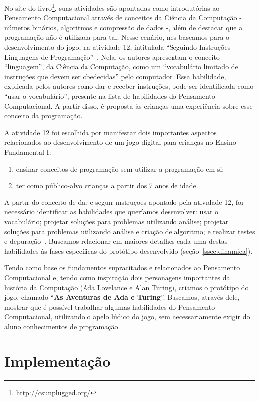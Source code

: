 No site do livro\footnote{http://csunplugged.org/}, suas atividades são apontadas como introdutórias ao Pensamento Computacional através de conceitos da Ciência da Computação - números binários, algoritmos e compressão de dados -, além de destacar que a programação não é utilizada para tal. Nesse cenário, nos baseamos para o desenvolvimento do jogo, na atividade 12, intitulada “Seguindo Instruções—Linguagens de Programação”~\cite[~p.101]{bell_computer_2011}. Nela, os autores apresentam o conceito “linguagem”, da Ciência da Computação, como um “vocabulário limitado de instruções que devem ser obedecidas” pelo computador. Essa habilidade, explicada pelos autores como dar e receber instruções, pode ser identificada como “usar o vocabulário”, presente na lista de habilidades do Pensamento Computacional. A partir disso, é proposta às crianças uma experiência sobre esse conceito da programação.

A atividade 12 foi escolhida por manifestar dois importantes aspectos relacionados ao desenvolvimento de um jogo digital para crianças no Ensino Fundamental I:

\begin{enumerate}
	\item ensinar conceitos de programação sem utilizar a programação em si;
	\item ter como público-alvo crianças a partir dos 7 anos de idade.
\end{enumerate}

A partir do conceito de dar e seguir instruções apontado pela atividade 12, foi necessário identificar as habilidades que queríamos desenvolver: usar o vocabulário; projetar soluções para problemas utilizando análise; projetar soluções para problemas utilizando análise e criação de algoritmo; e realizar testes e depuração~\cite{barr_bringing_2011}. Buscamos relacionar em maiores detalhes cada uma destas habilidades às fases específicas do protótipo desenvolvido (seção~\ref{ssec:dinamica}).

Tendo como base os fundamentos supracitados e relacionados ao Pensamento Computacional e, tendo como inspiração dois personagens importantes da história da Computação (Ada Lovelance e Alan Turing), criamos o protótipo do jogo, chamado “\textbf{As Aventuras de Ada e Turing}”. Buscamos, através dele, mostrar que é possível trabalhar algumas habilidades do Pensamento Computacional, utilizando o apelo lúdico do jogo, sem necessariamente exigir do aluno conhecimentos de programação.

\section{Implementação} \label{sec:implementacao}

